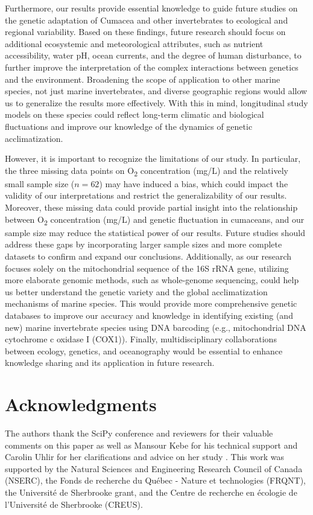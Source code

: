 Furthermore, our results provide essential knowledge to guide future studies on the genetic adaptation of Cumacea and other invertebrates to ecological and regional variability. Based on these findings, future research should focus on additional ecosystemic and meteorological attributes, such as nutrient accessibility, water pH, ocean currents, and the degree of human disturbance, to further improve the interpretation of the complex interactions between genetics and the environment. Broadening the scope of application to other marine species, not just marine invertebrates, and diverse geographic regions would allow us to generalize the results more effectively. With this in mind, longitudinal study models on these species could reflect long-term climatic and biological fluctuations and improve our knowledge of the dynamics of genetic acclimatization.

However, it is important to recognize the limitations of our study. In particular, the three missing data points on O\textsubscript{2} concentration (mg/L) and the relatively small sample size ($n=62$) may have induced a bias, which could impact the validity of our interpretations and restrict the generalizability of our results. Moreover, these missing data could provide partial insight into the relationship between O\textsubscript{2} concentration (mg/L) and genetic fluctuation in cumaceans, and our sample size may reduce the statistical power of our results. Future studies should address these gaps by incorporating larger sample sizes and more complete datasets to confirm and expand our conclusions. Additionally, as our research focuses solely on the mitochondrial sequence of the 16S rRNA gene, utilizing more elaborate genomic methods, such as whole-genome sequencing, could help us better understand the genetic variety and the global acclimatization mechanisms of marine species. This would provide more comprehensive genetic databases to improve our accuracy and knowledge in identifying existing (and new) marine invertebrate species using DNA barcoding (e.g., mitochondrial DNA cytochrome c oxidase I (COX1)). Finally, multidisciplinary collaborations between ecology, genetics, and oceanography would be essential to enhance knowledge sharing and its application in future research.

\section{Acknowledgments}\label{acknowledgments}
The authors thank the SciPy conference and reviewers for their valuable comments on this paper as well as Mansour Kebe for his technical support and Carolin Uhlir for her clarifications and advice on her study \citep{uhlir_adding_2021}. This work was supported by the Natural Sciences and Engineering Research Council of Canada (NSERC), the Fonds de recherche du Québec - Nature et technologies (FRQNT), the Université de Sherbrooke grant, and the Centre de recherche en écologie de l’Université de Sherbrooke (CREUS).
